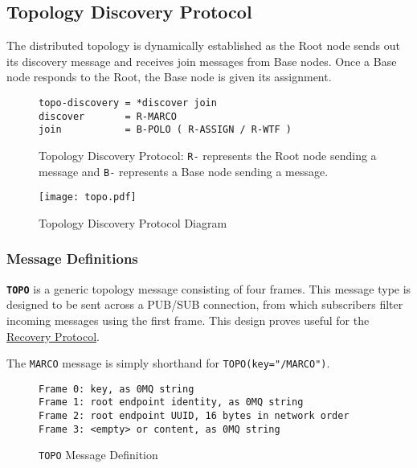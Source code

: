\subsection{Topology Discovery Protocol}
\label{proto_topo}

The \dcamp distributed topology is dynamically established as the Root node sends out its discovery message and receives
join messages from Base nodes. Once a Base node responds to the Root, the Base node is given its assignment.

\begin{figure}[H]
\vspace{+10pt}
\begin{verbatim}
topo-discovery = *discover join
discover       = R-MARCO
join           = B-POLO ( R-ASSIGN / R-WTF )
\end{verbatim}
\vspace{-5pt}
\caption[Topology Discovery Protocol]
        {Topology Discovery Protocol: \texttt{R-} represents the Root node sending a message and \texttt{B-}
         represents a Base node sending a message.}
\label{fig:proto_topo_spec}
\end{figure}

\begin{figure}[ht]
    \centering
    \texttt{[image: topo.pdf]}
    \label{fig:proto_topo_image}
    \caption{Topology Discovery Protocol Diagram}
\end{figure}

\subsubsection{Message Definitions}

\textbf{\texttt{TOPO}} is a generic topology message consisting of four frames. This message type is designed to be sent
across a PUB/SUB connection, from which subscribers filter incoming messages using the first frame. This design proves
useful for the \hyperref[proto_reco]{Recovery Protocol}.

The \texttt{MARCO} message is simply shorthand for \texttt{TOPO(key="/MARCO")}.

\begin{figure}[H]
\vspace{+10pt}
\begin{verbatim}
Frame 0: key, as 0MQ string
Frame 1: root endpoint identity, as 0MQ string
Frame 2: root endpoint UUID, 16 bytes in network order
Frame 3: <empty> or content, as 0MQ string
\end{verbatim}
\vspace{-20pt}
\caption{\texttt{TOPO} Message Definition}
\label{fig:message_topo}
\end{figure}

